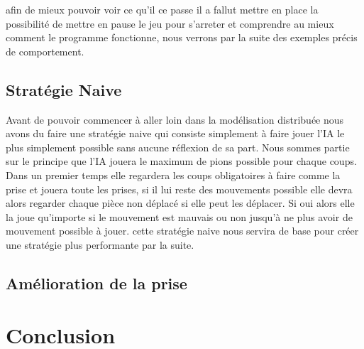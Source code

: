 \documentclass[11pt]{article} %
\begin{document}
afin de mieux pouvoir voir ce qu'il ce passe il a fallut mettre en place la possibilité de mettre en pause le jeu pour s'arreter et comprendre au mieux comment le programme fonctionne, nous verrons par la suite des exemples précis de comportement. \\

\subsection{Stratégie Naive}
Avant de pouvoir commencer à aller loin dans la modélisation distribuée nous avons du faire une stratégie naive qui consiste simplement à faire jouer l'IA le plus simplement possible sans aucune réflexion de sa part. Nous sommes partie sur le principe que l'IA jouera le maximum de pions possible pour chaque coups. Dans un premier temps elle regardera les coups obligatoires à faire comme la prise et jouera toute les prises, si il lui reste des mouvements possible elle devra alors regarder chaque pièce non déplacé si elle peut les déplacer. Si oui alors elle la joue qu'importe si le mouvement est mauvais ou non jusqu'à ne plus avoir de mouvement possible à jouer. cette stratégie naive nous servira de base pour créer une stratégie plus performante par la suite.

\subsection{Amélioration de la prise}



\section{Conclusion}
\end{document}
